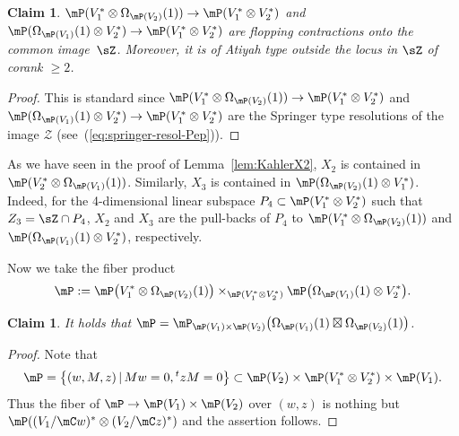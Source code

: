 \documentclass[pdftex]{sigma}
\numberwithin{equation}{section}
\newtheorem{cla}[Theorem]{Claim}
 { \theoremstyle{definition}
\newtheorem{Definition}[Theorem]{Definition}
\newtheorem{Observation}[Theorem]{Observation}
\newtheorem*{Main}{Main result}
\newtheorem{Remark}[Theorem]{Remark} }
\begin{document}
\begin{cla}$\mP(V_{1}^{*}\otimes\Omega_{\mP(V_{2})}(1))\to\mP(V_{1}^{*}\otimes V_{2}^{*})$ and $\mP(\Omega_{\mP(V_{1})}(1)\otimes V_{2}^{*})\to\mP(V_{1}^{*}\otimes V_{2}^{*})$ are flopping contractions onto the common image~$\sZ$. Moreover, it is of Atiyah type outside the locus in $\sZ$ of corank $\geq2$.
\end{cla}
\begin{proof} This is standard since $\mP(V_{1}^{*}\otimes\Omega_{\mP(V_{2})}(1))\to\mP(V_{1}^{*}\otimes V_{2}^{*})$ and $\mP(\Omega_{\mP(V_{1})}(1)\otimes V_{2}^{*})\to\mP(V_{1}^{*}\otimes V_{2}^{*})$ are the Springer type resolutions of the image $\mathcal{Z}$ (see~(\ref{eq:springer-resol-Pep})).
\end{proof}

As we have seen in the proof of Lemma~\ref{lem:KahlerX2}, $X_{2}$ is contained in
$\mP(V_{2}^{*}\otimes\Omega_{\mP(V_{1})}(1))$. Similarly, $X_{3}$
is contained in $\mP(\Omega_{\mP(V_{2})}(1)\otimes V_{1}^{*})$. Indeed,
for the 4-dimensional linear subspace $P_{4}\subset\mP(V_{1}^{*}\otimes V_{2}^{*})$
such that $Z_{3}=\sZ\cap P_{4}$, $X_{2}$ and $X_{3}$ are the pull-backs
of $P_{4}$ to $\mP(V_{1}^{*}\otimes\Omega_{\mP(V_{2})}(1))$ and
$\mP(\Omega_{\mP(V_{1})}(1)\otimes V_{2}^{*})$, respectively.

Now we take the fiber product
\begin{gather*}
\mP:=\mP\big(V_{1}^{*}\otimes\Omega_{\mP(V_{2})}(1)\big)\times_{\mP(V_{1}^{*}\otimes V_{2}^{*})}\mP\big(\Omega_{\mP(V_{1})}(1)\otimes V_{2}^{*}\big).
\end{gather*}
\begin{cla}
It holds that $\mP=\mP_{\mP(V_{1})\times\mP(V_{2})}\big(\Omega_{\mP(V_{1})}(1)\boxtimes\Omega_{\mP(V_{2})}(1)\big)$.
\end{cla}
\begin{proof}Note that
\begin{gather*}
\mP=\big\{(w,M,z)\,|\, Mw=0,{\empty^{t}z}M=0\big\}\subset\mP(V_{2})\times\mP(V_{1}^{*}\otimes V_{2}^{*})\times\mP(V_{1}).
\end{gather*}
Thus the fiber of $\mP\to\mP(V_{1})\times\mP(V_{2})$ over $(w,z)$ is nothing but $\mP((V_{1}/\mC w)^{*}\otimes(V_{2}/\mC z)^{*})$ and the assertion follows.
\end{proof}
\end{document}
